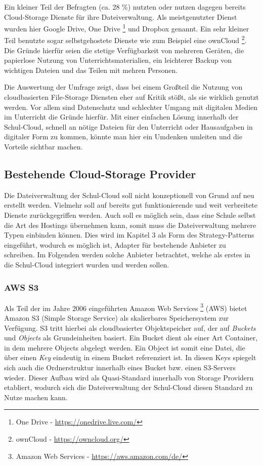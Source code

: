 Ein kleiner Teil der Befragten (ca. 28 \%) nutzten oder nutzen dagegen bereits Cloud-Storage Dienste für ihre Dateiverwaltung. Als meistgenutzter Dienst wurden hier Google Drive, One Drive  \footnote{One Drive - \url{https://onedrive.live.com/}} und Dropbox genannt. Ein sehr kleiner Teil benutzte sogar selbstgehostete Dienste wie zum Beispiel eine ownCloud \footnote{ownCloud - \url{https://owncloud.org/}}. Die Gründe hierfür seien die stetige Verfügbarkeit von mehreren Geräten, die papierlose Nutzung von Unterrichtsmaterialien, ein leichterer Backup von wichtigen Dateien und das Teilen mit mehren Personen. 

Die Auswertung der Umfrage zeigt, dass bei einem Großteil die Nutzung von cloudbasierten File-Storage Diensten eher auf Kritik stößt, als sie wirklich genutzt werden. Vor allem sind Datenschutz und schlechter Umgang mit digitalen Medien im Unterricht die Gründe hierfür. Mit einer einfachen Lösung innerhalb der Schul-Cloud, schnell an nötige Dateien für den Unterricht oder Hausaufgaben in digitaler Form zu kommen, könnte man hier ein Umdenken umleiten und die Vorteile sichtbar machen.

\subsection{Bestehende Cloud-Storage Provider}

Die Dateiverwaltung der Schul-Cloud soll nicht konzeptionell von Grund auf neu erstellt werden. Vielmehr soll auf bereits gut funktionierende und weit verbreitete Dienste zurückgegriffen werden. Auch soll es möglich sein, dass eine Schule selbst die Art des Hostings übernehmen kann, somit muss die Dateiverwaltung mehrere Typen einbinden können. Dies wird im Kapitel 3 als Form des Strategy-Patterns eingeführt, wodurch es möglich ist, Adapter für bestehende Anbieter zu schreiben. Im Folgenden werden solche Anbieter betrachtet, welche als erstes in die Schul-Cloud integriert wurden und werden sollen.

\subsubsection{AWS S3}
\label{sec:awss3related}

Als Teil der im Jahre 2006 eingeführten Amazon Web Services \footnote{Amazon Web Services - \url{https://aws.amazon.com/de/}} (AWS) bietet Amazon S3 (Simple Storage Service) als skalierbares Speichersystem zur Verfügung. S3 tritt hierbei als cloudbasierter Objektspeicher auf, der auf \textit{Buckets} und \textit{Objects} als Grundeinheiten basiert. Ein Bucket dient als einer Art Container, in dem mehrere Objects abgelegt werden. Ein Object ist somit eine Datei, die über einen \textit{Key} eindeutig in einem Bucket referenziert ist. In diesen Keys spiegelt sich auch die Ordnerstruktur innerhalb eines Bucket bzw. einen S3-Servers wieder. Dieser Aufbau wird als Quasi-Standard innerhalb von Storage Providern etabliert, wodurch sich die Dateiverwaltung der Schul-Cloud diesen Standard zu Nutze machen kann.

